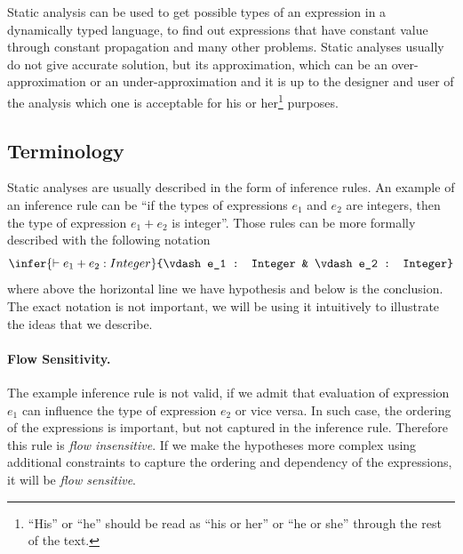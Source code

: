         Static analysis can be used to get possible types of an expression in 
        a dynamically typed language, to find out expressions that have constant 
        value through constant propagation and many other problems. 
        Static analyses usually do not give accurate solution, but 
        its approximation, which can be an over-approximation or 
        an under-approximation and it is up to the designer and user of the analysis 
        which one is acceptable for his or her\footnote{``His'' or ``he'' 
        should be read as ``his or her'' or ``he or she'' through the rest of the text.} 
        purposes.                
        
        \subsection{Terminology}
        
        Static analyses are usually described in the form of inference rules. 
        An example of an inference rule can be 
        ``if the types of expressions $e_1$ and $e_2$ are integers, then the type of 
        expression $e_1+e_2$ is integer''. Those rules can be more formally 
        described with the following notation        
        $$
        \infer{\vdash e_1+e_2 : Integer}{\vdash e_1 : Integer & \vdash e_2 : Integer}
        $$        
        where above the horizontal line we have hypothesis and below is 
        the conclusion. The exact notation is not important, we will be using it 
        intuitively to illustrate the ideas that we describe.
        
        \paragraph{Flow Sensitivity.}
        The example inference rule is not valid, if we admit that evaluation of 
        expression $e_1$ can influence the type of expression $e_2$ or vice versa. 
        In such case, the ordering of the expressions is important, but not captured 
        in the inference rule. Therefore this rule is \emph{flow insensitive}. If we make 
        the hypotheses more complex using additional constraints to capture the ordering 
        and dependency of the expressions, it will be \emph{flow sensitive}.
        
